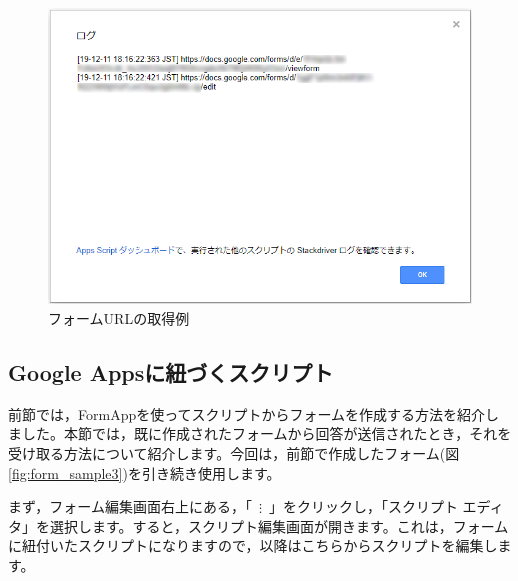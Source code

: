 \documentclass[uplatex,a4j]{jsarticle}
\begin{document}
\begin{figure}[H]
 \centering
 \includegraphics[keepaspectratio, scale=0.5]{images/form_sample2.png}
 \caption{フォームURLの取得例}
 \label{fig:form_sample2}
\end{figure}

\subsection{Google Appsに紐づくスクリプト}
\label{subsec:event_object}

前節では，FormAppを使ってスクリプトからフォームを作成する方法を紹介しました。本節では，既に作成されたフォームから回答が送信されたとき，それを受け取る方法について紹介します。今回は，前節で作成したフォーム(図\ref{fig:form_sample3})を引き続き使用します。

まず，フォーム編集画面右上にある，「\ $\mathbf{\vdots}$\ 」をクリックし，「スクリプト エディタ」を選択します。すると，スクリプト編集画面が開きます。これは，フォームに紐付いたスクリプトになりますので，以降はこちらからスクリプトを編集します。
\end{document}
